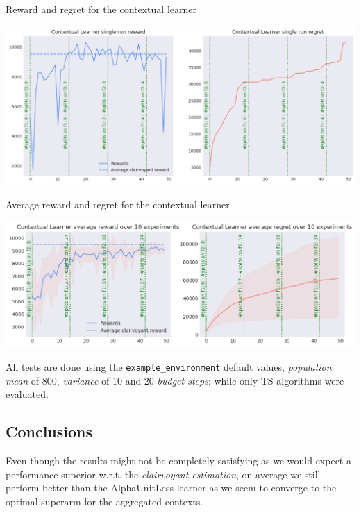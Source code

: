 Reward and regret for the contextual learner

\begin{center}
	\hspace*{-2em}
	\includegraphics[scale=0.5]{img/Graphs/context_generation/image1.png}
\end{center}

Average reward and regret for the contextual learner

\begin{center}
	\hspace*{-5em}
	\includegraphics[scale=0.7]{img/Graphs/context_generation/image2.png}
\end{center}

All tests are done using the \texttt{example\_environment} default values, \textit{population mean} of 800, \textit{variance} of 10 and 20 \textit{budget steps}; while only TS algorithms were evaluated.

\subsection{Conclusions}

Even though the results might not be completely satisfying as we would expect a performance superior w.r.t. the \textit{clairvoyant estimation}, on average we still perform better than the AlphaUnitLess learner as we seem to converge to the optimal superarm for the aggregated contexts.

